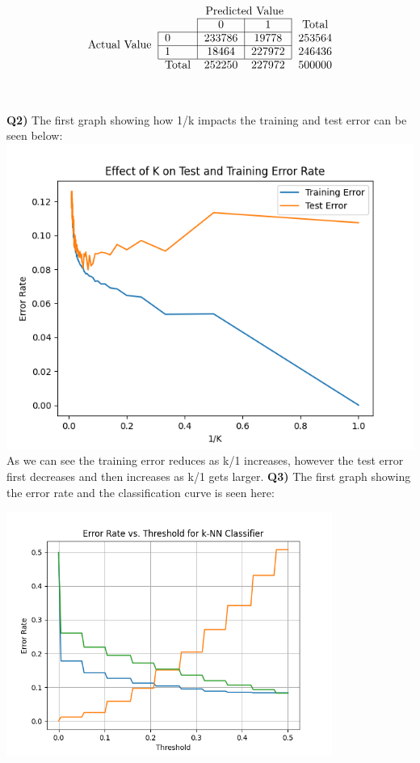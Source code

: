 \documentclass{article}
\begin{document}
\begin{titlepage}
\[\begin{tabular}{l|l|c|c|c}
\multicolumn{2}{c}{}&\multicolumn{2}{c}{Predicted Value}&\\
\cline{3-4}
\multicolumn{2}{c|}{}&0&1&\text{Total}\\
\cline{2-4}
\multirow{2}{*}{Actual Value}& 0 & $233786$ & $19778$ & $253564$\\
\cline{2-4}
& 1 & $18464$ & $227972$ & $246436$ \\
\cline{2-4}
\multicolumn{1}{c}{} & \multicolumn{1}{c}{Total} & \multicolumn{1}{c}{$252250$} & \multicolumn{    1}{c}{$227972$} & \multicolumn{1}{c}{$500000$}\\
\end{tabular}\] \\\\
\textbf{Q2)} The first graph showing how 1/k impacts the training and test error can be seen below:
\includegraphics[width=\textwidth]{myplot.png}
As we can see the training error reduces as k/1 increases, however the test error first decreases and then increases as k/1 gets larger.
\newpage
\textbf{Q3)} The first graph showing the error rate and the classification curve is seen here: \\
\begin{center}
\includegraphics[width=0.8\textwidth]{thresh.png}

\end{center}
\end{titlepage}
\end{document}
